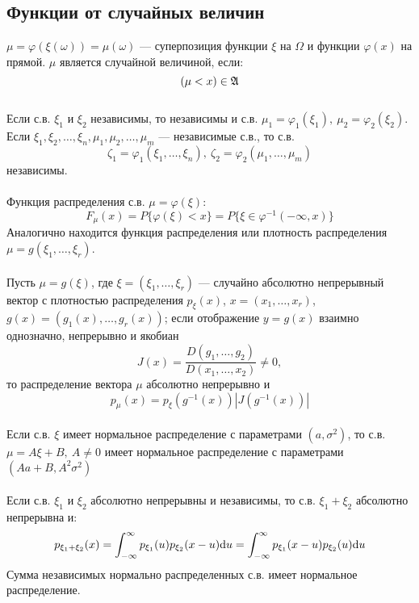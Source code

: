 \subsection{Функции от случайных величин}
$\mu = \varphi(\xi(\omega)) = \mu(\omega)$ --- суперпозиция функции $\xi$ на $\Omega$ и функции $\varphi(x)$ на прямой.
$\mu$ является случайной величиной, если:
\begin{equation*}
(\mu < x) \in \frak{A}
\end{equation*}
\\
Если с.в. $\xi_1$ и $\xi_2$ независимы, то независимы и с.в.
$\mu_1 = \varphi_1(\xi_1),\ \mu_2 = \varphi_2(\xi_2)$.\\
Если $\xi_1, \xi_2, \ldots, \xi_n, \mu_1, \mu_2, \ldots, \mu_m$ --- независимые с.в.,
то с.в.
\begin{equation*}
    \zeta_1 = \varphi_1(\xi_1, \ldots, \xi_n),\ \zeta_2 = \varphi_2(\mu_1, \ldots, \mu_m)
\end{equation*}
независимы.\\
\\
Функция распределения с.в. $\mu = \varphi(\xi)$:
\begin{equation*}
    F_\mu(x) = P\{\varphi(\xi) < x\} = P\{\xi \in \varphi^{-1}(-\infty, x)\}
\end{equation*}
Аналогично находится функция распределения или плотность распределения $\mu = g(\xi_1, \ldots, \xi_r)$.\\
\\
Пусть $\mu = g(\xi)$, где $\xi = (\xi_1, \ldots, \xi_r)$ --- случайно абсолютно непрерывный вектор
с плотностью распределения $p_\xi(x)$, $x = (x_1, \ldots, x_r)$, $g(x) = (g_1(x), \ldots, g_r(x))$;
если отображение $y = g(x)$ взаимно однозначно, непрерывно и якобиан
\begin{equation*}
    J(x) = \frac{D(g_1, \ldots, g_2)}{D(x_1, \ldots, x_2)} \neq 0,
\end{equation*}
то распределение вектора $\mu$ абсолютно непрерывно и
\begin{equation*}
    p_\mu(x) = p_\xi(g^{-1}(x)) |J(g^{-1}(x))|
\end{equation*}
\\
Если с.в. $\xi$ имеет нормальное распределение с параметрами $(a, \sigma^2)$,
то с.в. $\mu = A\xi + B,\ A \neq 0$ имеет нормальное распределение с параметрами $(Aa + B, A^2 \sigma^2)$\\
\\
Если с.в. $\xi_1$ и $\xi_2$ абсолютно непрерывны и независимы,
то с.в. $\xi_1 + \xi_2$ абсолютно непрерывна и:
\begin{equation*}
    p_{\xi_1 + \xi_2}(x)
    = \int_{-\infty}^\infty p_{\xi_1}(u) p_{\xi_2}(x - u) \mathrm{d} u
    = \int_{-\infty}^\infty p_{\xi_1}(x - u) p_{\xi_2}(u) \mathrm{d} u
\end{equation*}
Сумма независимых нормально распределенных с.в. имеет нормальное распределение.

